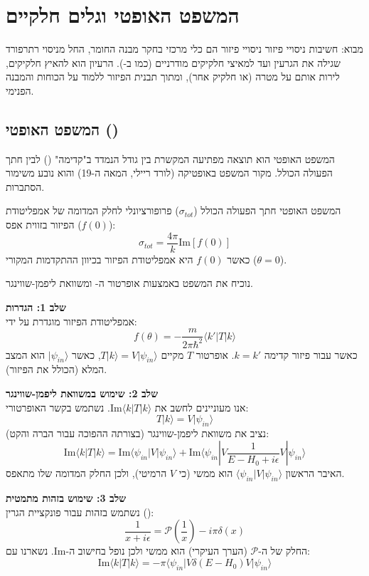 \section{המשפט האופטי וגלים חלקיים}

\begin{summary}{מבוא: חשיבות ניסויי פיזור}
ניסויי פיזור הם כלי מרכזי בחקר מבנה החומר, החל מניסוי רתרפורד שגילה את הגרעין ועד למאיצי חלקיקים מודרניים (כמו ב-). הרעיון הוא להאיץ חלקיקים, לירות אותם על מטרה (או חלקיק אחר), ומתוך תבנית הפיזור ללמוד על הכוחות והמבנה הפנימי.
\end{summary}

\subsection{המשפט האופטי ()}

המשפט האופטי הוא תוצאה מפתיעה המקשרת בין גודל הנמדד ב"קדימה" () לבין חתך הפעולה הכולל. מקור המשפט באופטיקה (לורד ריילי, המאה ה-19) והוא נובע משימור הסתברות.

\begin{theorembox}{המשפט האופטי}
חתך הפעולה הכולל ($\sigma_{tot}$) פרופורציונלי לחלק המדומה של אמפליטודת הפיזור בזווית אפס ($f(0)$):
\[
\sigma_{tot} = \frac{4\pi}{k} \text{Im}[f(0)]
\]
כאשר $f(0)$ היא אמפליטודת הפיזור בכיוון ההתקדמות המקורי ($\theta=0$).
\end{theorembox}


נוכיח את המשפט באמצעות אופרטור ה- ומשוואת ליפמן-שווינגר.

\textbf{שלב 1: הגדרות} \\
אמפליטודת הפיזור מוגדרת על ידי:
\[
f(\theta) = -\frac{m}{2\pi \hbar^2} \langle k' | T | k \rangle
\]
כאשר עבור פיזור קדימה $k=k'$. אופרטור $T$ מקיים $T|k\rangle = V|\psi_{in}\rangle$, כאשר $|\psi_{in}\rangle$ הוא המצב המלא (הכולל את הפיזור).

\textbf{שלב 2: שימוש במשוואת ליפמן-שווינגר} \\
אנו מעוניינים לחשב את $\text{Im}\langle k|T|k \rangle$. נשתמש בקשר האופרטורי:
\[
T|k\rangle = V|\psi_{in}\rangle
\]
נציב את משוואת ליפמן-שווינגר (בצורתה ההפוכה עבור הברה והקט):
\[
\text{Im}\langle k|T|k \rangle = \text{Im}\langle \psi_{in} | V | \psi_{in} \rangle + \text{Im} \langle \psi_{in} | V \frac{1}{E - H_0 + i\epsilon} V | \psi_{in} \rangle
\]
האיבר הראשון $\langle \psi_{in} | V | \psi_{in} \rangle$ הוא ממשי (כי $V$ הרמיטי), ולכן החלק המדומה שלו מתאפס.

\textbf{שלב 3: שימוש בזהות מתמטית} \\
נשתמש בזהות עבור פונקציית הגרין ():
\[
\frac{1}{x + i\epsilon} = \mathcal{P}\left(\frac{1}{x}\right) - i\pi \delta(x)
\]
החלק של ה-$\mathcal{P}$ (הערך העיקרי) הוא ממשי ולכן נופל בחישוב ה-$\text{Im}$. נשארנו עם:
\[
\text{Im}\langle k|T|k \rangle = -\pi \langle \psi_{in} | V \delta(E - H_0) V | \psi_{in} \rangle
\]

